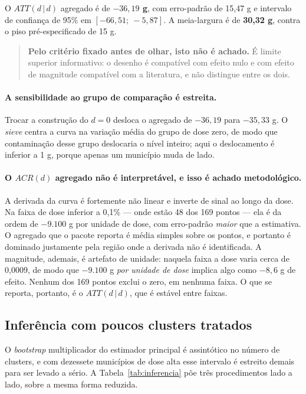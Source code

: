 O \(ATT(d\,|\,d)\) agregado é de \textbf{\(-36{,}19\) g}, com erro-padrão de
15,47 g e intervalo de confiança de 95\% em \([-66{,}51;\ -5{,}87]\). A
meia-largura é de \textbf{30,32 g}, contra o piso pré-especificado de 15 g.

\begin{quote}
\textbf{Pelo critério fixado antes de olhar, isto não é achado.} É limite
superior informativo: o desenho é compatível com efeito nulo e com efeito de
magnitude compatível com a literatura, e não distingue entre os dois.
\end{quote}

\paragraph{A sensibilidade ao grupo de comparação é estreita.}
Trocar a construção do \(d = 0\) desloca o agregado de \(-36{,}19\) para
\(-35{,}33\) g. O \emph{sieve} centra a curva na variação média do grupo de dose
zero, de modo que contaminação desse grupo deslocaria o nível inteiro; aqui o
deslocamento é inferior a 1 g, porque apenas um município muda de lado.

\paragraph{O \(ACR(d)\) agregado não é interpretável, e isso é achado
metodológico.}
A derivada da curva é fortemente não linear e inverte de sinal ao longo da dose.
Na faixa de dose inferior a 0{,}1\% --- onde estão 48 dos 169 pontos --- ela é
da ordem de \(-9.100\) g por unidade de dose, com erro-padrão \emph{maior} que a
estimativa. O agregado que o pacote reporta é média simples sobre os pontos, e
portanto é dominado justamente pela região onde a derivada não é identificada.
A magnitude, ademais, é artefato de unidade: naquela faixa a dose varia cerca de
0{,}0009, de modo que \(-9.100\) g \emph{por unidade de dose} implica algo como
\(-8{,}6\) g de efeito. Nenhum dos 169 pontos exclui o zero, em nenhuma faixa. O
que se reporta, portanto, é o \(ATT(d\,|\,d)\), que é estável entre faixas.

\subsection{Inferência com poucos clusters tratados}
\label{sub:inferencia-poucos}

O \emph{bootstrap} multiplicador do estimador principal é assintótico no número
de clusters, e com dezessete municípios de dose alta esse intervalo é estreito
demais para ser levado a sério. A Tabela~\ref{tab:inferencia} põe três
procedimentos lado a lado, sobre a mesma forma reduzida.

